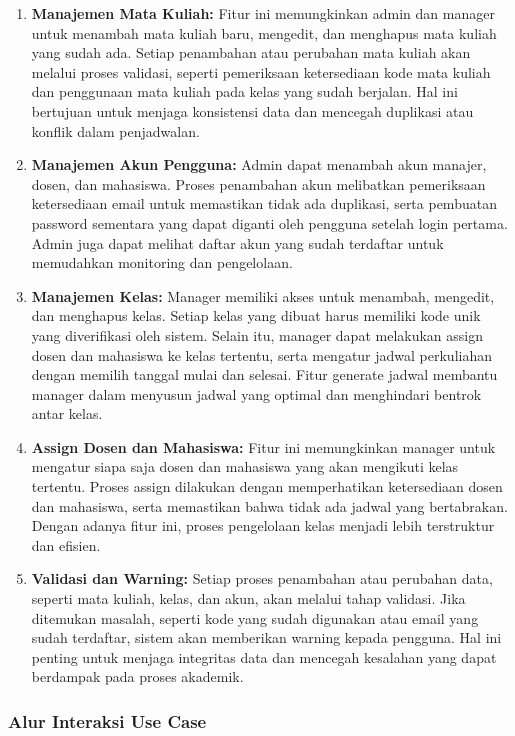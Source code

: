 \documentclass[a4paper,oneside,11pt]{book}
\begin{document}
\begin{enumerate}
  \item \textbf{Manajemen Mata Kuliah:} Fitur ini memungkinkan admin dan manager untuk menambah mata kuliah baru, mengedit, dan menghapus mata kuliah yang sudah ada. Setiap penambahan atau perubahan mata kuliah akan melalui proses validasi, seperti pemeriksaan ketersediaan kode mata kuliah dan penggunaan mata kuliah pada kelas yang sudah berjalan. Hal ini bertujuan untuk menjaga konsistensi data dan mencegah duplikasi atau konflik dalam penjadwalan.
  \item \textbf{Manajemen Akun Pengguna:} Admin dapat menambah akun manajer, dosen, dan mahasiswa. Proses penambahan akun melibatkan pemeriksaan ketersediaan email untuk memastikan tidak ada duplikasi, serta pembuatan password sementara yang dapat diganti oleh pengguna setelah login pertama. Admin juga dapat melihat daftar akun yang sudah terdaftar untuk memudahkan monitoring dan pengelolaan.
  \item \textbf{Manajemen Kelas:} Manager memiliki akses untuk menambah, mengedit, dan menghapus kelas. Setiap kelas yang dibuat harus memiliki kode unik yang diverifikasi oleh sistem. Selain itu, manager dapat melakukan assign dosen dan mahasiswa ke kelas tertentu, serta mengatur jadwal perkuliahan dengan memilih tanggal mulai dan selesai. Fitur generate jadwal membantu manager dalam menyusun jadwal yang optimal dan menghindari bentrok antar kelas.
  \item \textbf{Assign Dosen dan Mahasiswa:} Fitur ini memungkinkan manager untuk mengatur siapa saja dosen dan mahasiswa yang akan mengikuti kelas tertentu. Proses assign dilakukan dengan memperhatikan ketersediaan dosen dan mahasiswa, serta memastikan bahwa tidak ada jadwal yang bertabrakan. Dengan adanya fitur ini, proses pengelolaan kelas menjadi lebih terstruktur dan efisien.
  \item \textbf{Validasi dan Warning:} Setiap proses penambahan atau perubahan data, seperti mata kuliah, kelas, dan akun, akan melalui tahap validasi. Jika ditemukan masalah, seperti kode yang sudah digunakan atau email yang sudah terdaftar, sistem akan memberikan warning kepada pengguna. Hal ini penting untuk menjaga integritas data dan mencegah kesalahan yang dapat berdampak pada proses akademik.
\end{enumerate}


\subsubsection{Alur Interaksi Use Case}
\end{document}
